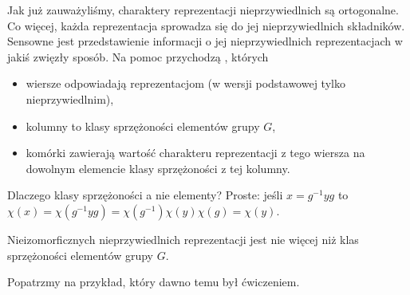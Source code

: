 Jak już zauważyliśmy, charaktery reprezentacji nieprzywiedlnich są ortogonalne. Co więcej, każda reprezentacja sprowadza się do jej nieprzywiedlnich składników. Sensowne jest przedstawienie informacji o jej nieprzywiedlnich reprezentacjach w jakiś zwięzły sposób. Na pomoc przychodzą , których 
\begin{itemize}
  \item wiersze odpowiadają reprezentacjom (w wersji podstawowej tylko nieprzywiedlnim),
  \item kolumny to klasy sprzężoności elementów grupy $G$,
  \item komórki zawierają wartość charakteru reprezentacji z tego wiersza na dowolnym elemencie klasy sprzężoności z tej kolumny.
\end{itemize}

Dlaczego klasy sprzężoności a nie elementy? Proste: jeśli $x=g^{-1}yg$ to $\chi(x)=\chi(g^{-1}yg)=\chi(g^{-1})\chi(y)\chi(g)=\chi(y)$.

\begin{remark}{}{}
  Nieizomorficznych nieprzywiedlnich reprezentacji jest nie więcej niż klas sprzężoności elementów grupy $G$.
\end{remark}

Popatrzmy na przykład, który dawno temu był ćwiczeniem.

